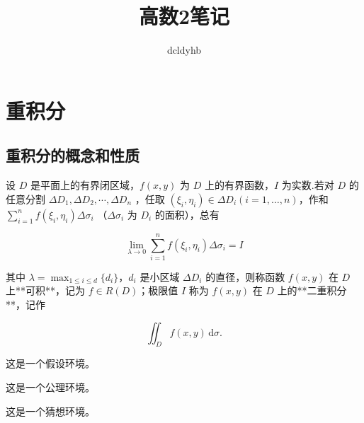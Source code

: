 \documentclass[lang = zh , final , oneside , openany , titlepage , zihao = -4 , linespread = 1.3 , baselineskip = false , cjk-font = windows , text-font = newtx , math-font = newtx]{sjtureport}
\title{高数2笔记}
\author{dcldyhb}
\begin{document}
\maketitle

\setcounter{page}{1}  %
\pagestyle{plain}     %
\tableofcontents


\newpage
\setcounter{page}{1}  %
\pagestyle{plain}     %
\chapter{重积分}
\section{重积分的概念和性质}
\begin{definition}
    设 $D$ 是平面上的有界闭区域，$f(x,y)$ 为 $D$ 上的有界函数，$I$ 为实数.若对 $D$ 的任意分割 $\Delta D_1 , \Delta D_2 , \cdots , \Delta D_n$ ，任取 $(\xi_i , \eta_i)\in\Delta D_i(i=1,\ldots,n)$，作和 $\displaystyle\sum_{i=1}^nf(\xi_i,\eta_i)\Delta \sigma_i$ （$\Delta \sigma_i$ 为 $D_i$ 的面积），总有

    $$
    \lim_{\lambda\to 0}\sum_{i=1}^nf(\xi_i,\eta_i)\Delta \sigma_i = I
    $$

    其中 $\displaystyle\lambda = \max_{1\leq i\leq d} \{d_i\}$，$d_i$ 是小区域 $\Delta D_i$ 的直径，则称函数 $f(x,y)$ 在 $D$ 上**可积**，记为 $f\in R(D)$；极限值 $I$ 称为 $f(x,y)$ 在 $D$ 上的**二重积分**，记作

    $$
    \iint_D f(x,y)\,\mathrm{d}\sigma.
    $$
\end{definition}

\begin{assumption}
    这是一个假设环境。
\end{assumption}

\begin{axiom}
    这是一个公理环境。
\end{axiom}

\begin{conjecture}
    这是一个猜想环境。
\end{conjecture}

\nocite{*}

\end{document}
